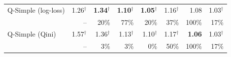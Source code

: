 \begin{tabular}{l|rrrrrrr}
Q-Simple (log-loss) & 1.26$^\dagger$ & \textbf{1.34}$^\dagger$ & \textbf{1.10}$^\dagger$ & \textbf{1.05}$^\dagger$ & 1.16$^\dagger$ & 1.08 & 1.03$^\dagger$ \\
 & \scriptsize -- & \scriptsize 20\% & \scriptsize 77\% & \scriptsize 20\% & \scriptsize 37\% & \scriptsize 100\% & \scriptsize 17\% \\[2pt]
Q-Simple (Qini) & 1.57$^\dagger$ & 1.36$^\dagger$ & 1.13$^\dagger$ & 1.10$^\dagger$ & 1.17$^\dagger$ & \textbf{1.06} & 1.03$^\dagger$ \\
 & \scriptsize -- & \scriptsize 3\% & \scriptsize 3\% & \scriptsize 0\% & \scriptsize 50\% & \scriptsize 100\% & \scriptsize 17\% \\[2pt]
\hline
\end{tabular}
